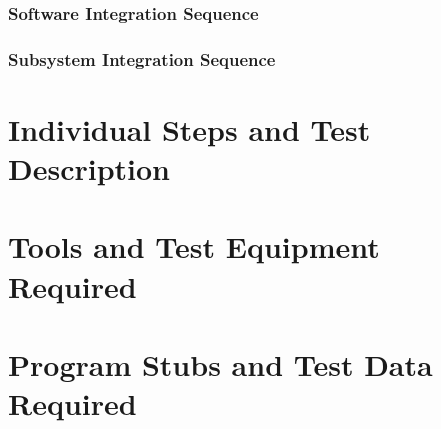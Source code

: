 \documentclass{article}
\begin{document}
\subsubsection{Software Integration Sequence}
\subsubsection{Subsystem Integration Sequence}
\section{Individual Steps and Test Description}
\section{Tools and Test Equipment Required}
\section{Program Stubs and Test Data Required}
\end{document}
